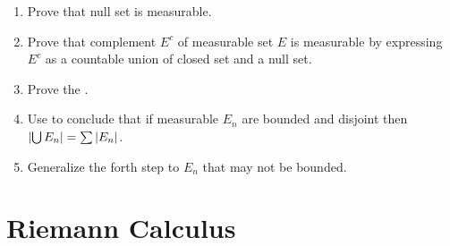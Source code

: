\documentclass{report}
\begin{document}
\begin{mdframed}
\begin{enumerate}[label=(\roman*)]
\item Prove that null set is measurable.  
  \item Prove that complement $E^c$ of measurable set $E$ is measurable by expressing $E^c$ as a countable union of closed set and a null set.
  \item Prove the .  
  \item Use  to conclude that if measurable $E_n$ are bounded and disjoint then $\left|\bigcup E_n\right|= \sum \left|E_n\right|$. 
  \item Generalize the forth step to $E_n$ that may not be bounded. 
\end{enumerate}
\end{mdframed}

\chapter{Riemann Calculus}
\end{document}
